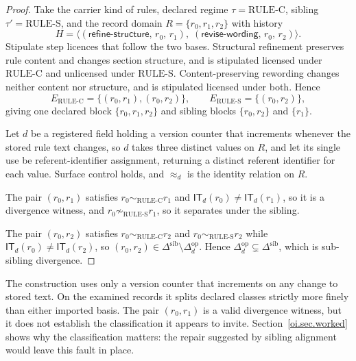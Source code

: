 \documentclass[11pt]{article}
\theoremstyle{plain}
\theoremstyle{definition}
\theoremstyle{remark}
\newcommand{\RULEC}{\ensuremath{\mathrm{RULE\text{-}C}}}
\newcommand{\RULES}{\ensuremath{\mathrm{RULE\text{-}S}}}
\newcommand{\IT}{\ensuremath{\mathsf{IT}}}
\newcommand{\Ker}{\ensuremath{\mathrel{\approx_{d}}}}
\newcommand{\Dop}{\ensuremath{\Delta^{\mathrm{op}}_{d}}}
\newcommand{\Dsib}{\ensuremath{\Delta^{\mathrm{sib}}}}
\begin{document}
\begin{proof}
  Take the carrier kind of rules,
  declared regime \(\tau=\RULEC\), sibling \(\tau'=\RULES\),
  and the record domain \(R=\{r_0,r_1,r_2\}\)
  with history
  \[
    H
    =
    \bigl\langle
    (\textsf{refine-structure},\,r_0,\,r_1),\;
    (\textsf{revise-wording},\,r_0,\,r_2)
    \bigr\rangle.
  \]
  Stipulate step licences that follow the two bases.
  Structural refinement preserves rule content and changes section structure,
  and is stipulated licensed under \RULEC{} and unlicensed under \RULES{}.
  Content-preserving rewording changes neither content nor structure,
  and is stipulated licensed under both.
  Hence
  \[
    E_{\RULEC}=\{(r_0,r_1),(r_0,r_2)\},
    \qquad
    E_{\RULES}=\{(r_0,r_2)\},
  \]
  giving one declared block \(\{r_0,r_1,r_2\}\)
  and sibling blocks \(\{r_0,r_2\}\) and \(\{r_1\}\).

  Let \(d\) be a registered field holding a version counter
  that increments whenever the stored rule text changes,
  so \(d\) takes three distinct values on \(R\),
  and let its single use be referent-identifier assignment,
  returning a distinct referent identifier for each value.
  Surface control holds,
  and \(\Ker\) is the identity relation on \(R\).

  The pair \((r_0,r_1)\) satisfies \(r_0\sim_{\RULEC}r_1\)
  and \(\IT_d(r_0)\neq\IT_d(r_1)\),
  so it is a divergence witness,
  and \(r_0\not\sim_{\RULES}r_1\),
  so it separates under the sibling.

  The pair \((r_0,r_2)\) satisfies \(r_0\sim_{\RULEC}r_2\)
  and \(r_0\sim_{\RULES}r_2\)
  while \(\IT_d(r_0)\neq\IT_d(r_2)\),
  so \((r_0,r_2)\in\Dsib\setminus\Dop\).
  Hence \(\Dop\subsetneq\Dsib\),
  which is sub-sibling divergence.
\end{proof}

The construction uses only a version counter
that increments on any change to stored text.
On the examined records it splits declared classes
strictly more finely than either imported basis.
The pair \((r_0,r_1)\) is a valid divergence witness,
but it does not establish the classification it appears to invite.
Section~\ref{oi.sec.worked} shows why the classification matters:
the repair suggested by sibling alignment
would leave this fault in place.
\end{document}

